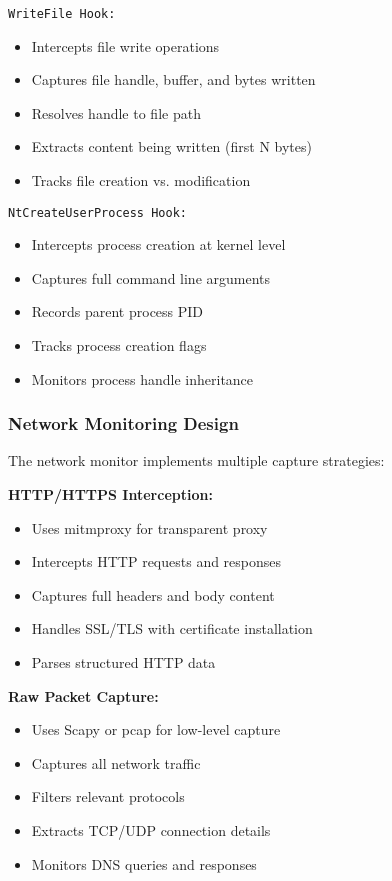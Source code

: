 \texttt{WriteFile Hook:}
\begin{itemize}
    \item Intercepts file write operations
    \item Captures file handle, buffer, and bytes written
    \item Resolves handle to file path
    \item Extracts content being written (first N bytes)
    \item Tracks file creation vs. modification
\end{itemize}

\texttt{NtCreateUserProcess Hook:}
\begin{itemize}
    \item Intercepts process creation at kernel level
    \item Captures full command line arguments
    \item Records parent process PID
    \item Tracks process creation flags
    \item Monitors process handle inheritance
\end{itemize}

\subsubsection{Network Monitoring Design}

The network monitor implements multiple capture strategies:

\textbf{HTTP/HTTPS Interception:}
\begin{itemize}
    \item Uses mitmproxy for transparent proxy
    \item Intercepts HTTP requests and responses
    \item Captures full headers and body content
    \item Handles SSL/TLS with certificate installation
    \item Parses structured HTTP data
\end{itemize}

\textbf{Raw Packet Capture:}
\begin{itemize}
    \item Uses Scapy or pcap for low-level capture
    \item Captures all network traffic
    \item Filters relevant protocols
    \item Extracts TCP/UDP connection details
    \item Monitors DNS queries and responses
\end{itemize}

